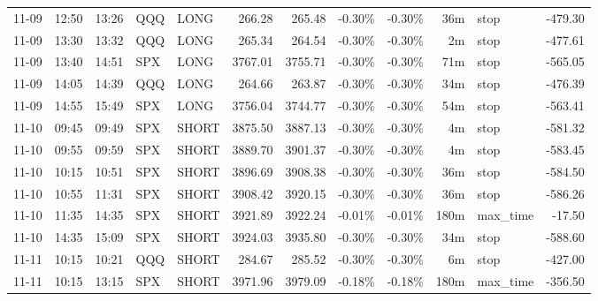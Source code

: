 \documentclass[11pt,a4paper,twoside]{article}
\begin{document}
\begin{center}
\begin{longtable}{>{\color{txtmain}}l l l l l r r r r r >{\color{txtmain}}l r}
11-09 & 12:50 & 13:26 & QQQ & LONG & 266.28 & 265.48 & \textcolor{lossred}{-0.30\%} & \textcolor{lossred}{-0.30\%} & 36m & stop & \textcolor{lossred}{-479.30} \\
11-09 & 13:30 & 13:32 & QQQ & LONG & 265.34 & 264.54 & \textcolor{lossred}{-0.30\%} & \textcolor{lossred}{-0.30\%} & 2m & stop & \textcolor{lossred}{-477.61} \\
11-09 & 13:40 & 14:51 & SPX & LONG & 3767.01 & 3755.71 & \textcolor{lossred}{-0.30\%} & \textcolor{lossred}{-0.30\%} & 71m & stop & \textcolor{lossred}{-565.05} \\
11-09 & 14:05 & 14:39 & QQQ & LONG & 264.66 & 263.87 & \textcolor{lossred}{-0.30\%} & \textcolor{lossred}{-0.30\%} & 34m & stop & \textcolor{lossred}{-476.39} \\
11-09 & 14:55 & 15:49 & SPX & LONG & 3756.04 & 3744.77 & \textcolor{lossred}{-0.30\%} & \textcolor{lossred}{-0.30\%} & 54m & stop & \textcolor{lossred}{-563.41} \\
11-10 & 09:45 & 09:49 & SPX & SHORT & 3875.50 & 3887.13 & \textcolor{lossred}{-0.30\%} & \textcolor{lossred}{-0.30\%} & 4m & stop & \textcolor{lossred}{-581.32} \\
11-10 & 09:55 & 09:59 & SPX & SHORT & 3889.70 & 3901.37 & \textcolor{lossred}{-0.30\%} & \textcolor{lossred}{-0.30\%} & 4m & stop & \textcolor{lossred}{-583.45} \\
11-10 & 10:15 & 10:51 & SPX & SHORT & 3896.69 & 3908.38 & \textcolor{lossred}{-0.30\%} & \textcolor{lossred}{-0.30\%} & 36m & stop & \textcolor{lossred}{-584.50} \\
11-10 & 10:55 & 11:31 & SPX & SHORT & 3908.42 & 3920.15 & \textcolor{lossred}{-0.30\%} & \textcolor{lossred}{-0.30\%} & 36m & stop & \textcolor{lossred}{-586.26} \\
11-10 & 11:35 & 14:35 & SPX & SHORT & 3921.89 & 3922.24 & \textcolor{lossred}{-0.01\%} & \textcolor{lossred}{-0.01\%} & 180m & max\_time & \textcolor{lossred}{-17.50} \\
11-10 & 14:35 & 15:09 & SPX & SHORT & 3924.03 & 3935.80 & \textcolor{lossred}{-0.30\%} & \textcolor{lossred}{-0.30\%} & 34m & stop & \textcolor{lossred}{-588.60} \\
11-11 & 10:15 & 10:21 & QQQ & SHORT & 284.67 & 285.52 & \textcolor{lossred}{-0.30\%} & \textcolor{lossred}{-0.30\%} & 6m & stop & \textcolor{lossred}{-427.00} \\
11-11 & 10:15 & 13:15 & SPX & SHORT & 3971.96 & 3979.09 & \textcolor{lossred}{-0.18\%} & \textcolor{lossred}{-0.18\%} & 180m & max\_time & \textcolor{lossred}{-356.50} \\

\end{longtable}
\end{center}
\end{document}
